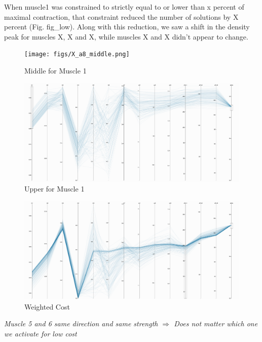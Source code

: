 When muscle1 was constrained to strictly equal to or lower than x percent of maximal contraction, that constraint reduced the number of solutions by X percent (Fig. fig_low). Along with this reduction,  we saw a shift in the density peak for muscles X, X and X, while muscles X and X didn't appear to change.

\begin{figure}[ht]
   \begin{center}
    \texttt{[image: figs/X\_a8\_middle.png]}
  \end{center}
  \caption{Middle for Muscle 1}
  \label{fig_mid}
\end{figure}



\begin{figure}[ht]
   \begin{center}
    \includegraphics[width=1.0\textwidth]{figs/X_a8_upper.png}
  \end{center}
  \caption{Upper for Muscle 1}
  \label{fig_high}
\end{figure}

\begin{figure}[ht]
   \begin{center}
    \includegraphics[width=1.0\textwidth]{figs/X_a8_weightedcost.png}
  \end{center}
  \caption{Weighted Cost}
  \label{fig_cost}
\end{figure}

\textit{Muscle 5 and 6 same direction and same strength $\Rightarrow$ Does not matter which one we activate for low cost}
